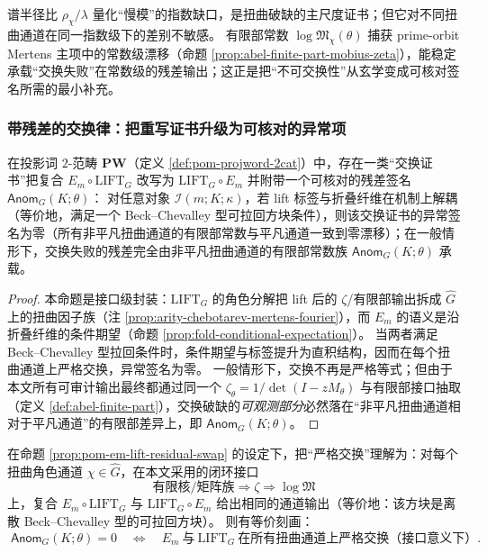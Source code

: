 \begin{remark}[为何选有限部而非仅选谱半径比]\label{rem:pom-anom-why-finite-part}
谱半径比 \(\rho_\chi/\lambda\) 量化“慢模”的指数缺口，是扭曲破缺的主尺度证书；但它对不同扭曲通道在同一指数级下的差别不敏感。
有限部常数 \(\log\mathfrak{M}_\chi(\theta)\) 捕获 prime-orbit Mertens 主项中的常数级漂移（命题 \ref{prop:abel-finite-part-mobius-zeta}），能稳定承载“交换失败”在常数级的残差输出；这正是把“不可交换性”从玄学变成可核对签名所需的最小补充。
\end{remark}

\subsubsection{带残差的交换律：把重写证书升级为可核对的异常项}\label{subsec:pom-residual-swap}

\begin{proposition}\label{prop:pom-em-lift-residual-swap}
在投影词 $2$-范畴 \(\mathbf{PW}\)（定义 \ref{def:pom-projword-2cat}）中，存在一类“交换证书”把复合
\(
E_m\circ \mathrm{LIFT}_G
\)
改写为
\(
\mathrm{LIFT}_G\circ E_m
\)
并附带一个可核对的残差签名 \(\mathsf{Anom}_G(K;\theta)\)：
对任意对象 \(\mathcal{I}(m;K;\kappa)\)，若 lift 标签与折叠纤维在机制上解耦（等价地，满足一个 Beck--Chevalley 型可拉回方块条件），则该交换证书的异常签名为零（所有非平凡扭曲通道的有限部常数与平凡通道一致到零漂移）；在一般情形下，交换失败的残差完全由非平凡扭曲通道的有限部常数族 \(\mathsf{Anom}_G(K;\theta)\) 承载。
\end{proposition}

\begin{proof}
本命题是接口级封装：\(\mathrm{LIFT}_G\) 的角色分解把 lift 后的 \(\zeta\)/有限部输出拆成 \(\widehat G\) 上的扭曲因子族（注 \ref{prop:arity-chebotarev-mertens-fourier}），而 \(E_m\) 的语义是沿折叠纤维的条件期望（命题 \ref{prop:fold-conditional-expectation}）。
当两者满足 Beck--Chevalley 型拉回条件时，条件期望与标签提升为直积结构，因而在每个扭曲通道上严格交换，异常签名为零。
一般情形下，交换不再是严格等式；但由于本文所有可审计输出最终都通过同一个 \(\zeta_\theta=1/\det(I-zM_\theta)\) 与有限部接口抽取（定义 \ref{def:abel-finite-part}），交换破缺的\emph{可观测部分}必然落在“非平凡扭曲通道相对于平凡通道”的有限部差异上，即 \(\mathsf{Anom}_G(K;\theta)\)。
\end{proof}

\begin{corollary}\label{cor:pom-zero-anom-pullback-exactness}
在命题 \ref{prop:pom-em-lift-residual-swap} 的设定下，把“严格交换”理解为：对每个扭曲角色通道 \(\chi\in\widehat G\)，在本文采用的闭环接口
\[
\text{有限核/矩阵族}\Rightarrow \zeta \Rightarrow \log\mathfrak{M}
\]
上，复合 \(E_m\circ \mathrm{LIFT}_G\) 与 \(\mathrm{LIFT}_G\circ E_m\) 给出相同的通道输出（等价地：该方块是离散 Beck--Chevalley 型的可拉回方块）。
则有等价刻画：
\[
\boxed{\;
\mathsf{Anom}_G(K;\theta)=0
\quad\Longleftrightarrow\quad
E_m\ \text{与}\ \mathrm{LIFT}_G\ \text{在所有扭曲通道上严格交换（接口意义下）}.}
\]
\end{corollary}

